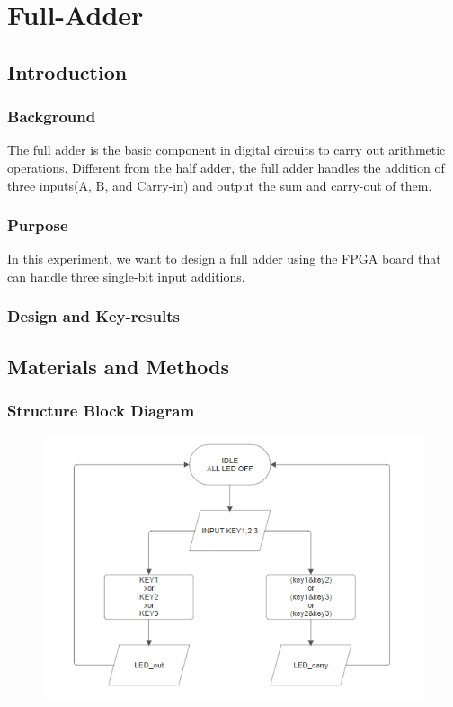 \section{Full-Adder}
\subsection{Introduction}%
    \subsubsection{Background}%
    The full adder is the basic component in digital circuits to carry out
    arithmetic operations. Different from the half adder, the full adder
    handles the addition of three inputs(A, B, and Carry-in) and output 
    the sum and carry-out of them.

    \subsubsection{Purpose}
    In this experiment, we want to design a full adder using the FPGA board that can handle three single-bit input additions. 

    \subsubsection{Design and Key-results}
    
\subsection{Materials and Methods}%
    \subsubsection{Structure Block Diagram}
        \begin{figure}[h]
        \centering
        \includegraphics[width=0.8\linewidth]{Structure_Block_Diagram/fulladder_BlockStructureDiagram.png}
        \label{fa_SBD}
    \end{figure}
    \FloatBarrier

